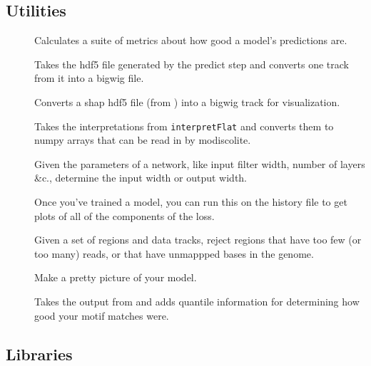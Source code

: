 \documentclass{article}
\begin{document}
\subsection{Utilities}

\begin{description}
    \item [] Calculates a suite of metrics about how good a
        model's predictions are.
    \item [] Takes the hdf5 file generated by the
        predict step and converts one track from it into a bigwig
        file.\label{prog:predictToBigwig}
    \item [] Converts a shap hdf5 file (from
        ) into a bigwig track for
        visualization.\label{prog:shapToBigwig}
    \item [] Takes the interpretations from
        \texttt{interpretFlat} and converts them to numpy arrays that can be
        read in by modiscolite.\label{prog:shapToNumpy}
    \item [] Given the parameters of a network, like input
        filter width, number of layers \&c., determine the input width or
        output width. \label{prog:lengthCalc}
    \item [] Once you've trained a model, you can run
        this on the history file to get plots of all of the components of the
        loss. \label{prog:makeLossPlots}
    \item [] Given a set of regions and data tracks, reject
        regions that have too few (or too many) reads, or that have unmappped
        bases in the genome.
    \item [] Make a pretty picture of your
        model.\label{prog:showModel}
    \item [] Takes the output from
         and adds quantile information for determining how
        good your motif matches were.
\end{description}

\subsection{Libraries}
\end{document}
